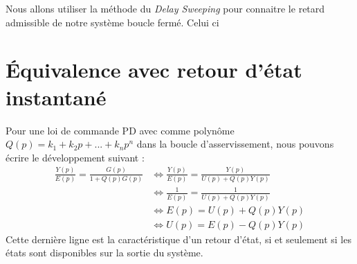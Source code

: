 Nous allons utiliser la méthode du \emph{Delay Sweeping} pour connaitre le retard admissible de notre système boucle fermé. Celui ci 
\section{Équivalence avec retour d'état instantané}
Pour une loi de commande PD avec comme polynôme $Q(p) = k_1+k_2p+...+k_np^n$ dans la boucle d'asservissement, nous pouvons écrire le développement suivant : 
\begin{align*}
\frac{Y(p)}{E(p)} = \frac{G(p)}{1 + Q(p)G(p)} & \Leftrightarrow \frac{Y(p)}{E(p)} = \frac{Y(p)}{U(p) + Q(p)Y(p)}\\
&\Leftrightarrow \frac{1}{E(p)} = \frac{1}{U(p) + Q(p)Y(p)} \\
& \Leftrightarrow E(p) = U(p) + Q(p)Y(p)\\
& \Leftrightarrow U(p) = E(p) - Q(p)Y(p)
\end{align*} 
Cette dernière ligne est la caractéristique d'un retour d'état, si et seulement si les états sont disponibles sur la sortie du système.